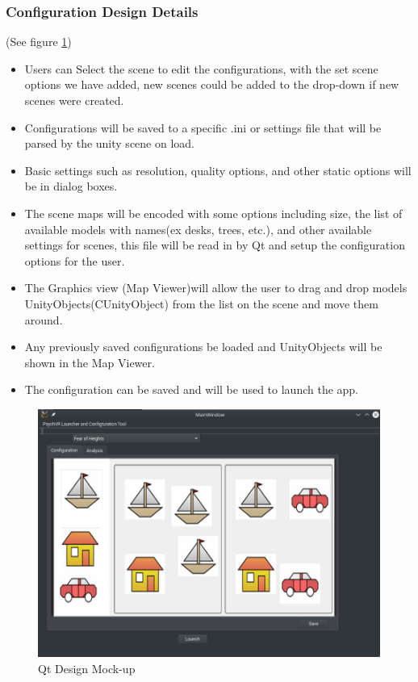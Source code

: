 \documentclass[a4paper,10pt]{article}
\begin{document}
\subsubsection {Configuration Design Details}
(See figure \ref{fig:qtMockupMap})
\begin{itemize}
\item Users can Select the scene to edit the configurations, with the set scene options we have added, new scenes could be added to the drop-down if new scenes were created.
\item Configurations will be saved to a specific .ini or settings file that will be parsed by the unity scene on load.
\item Basic settings such as resolution, quality options, and other static options will be in dialog boxes.
\item The scene maps will be encoded with some options including size, the list of available models with names(ex desks, trees, etc.), and other available settings for scenes, this file will be read in by Qt and setup the configuration options for the user.
\item The Graphics view (Map Viewer)will allow the user to drag and drop models UnityObjects(CUnityObject) from the list on the scene and move them around. %
\item Any previously saved configurations be loaded and UnityObjects will be shown in the Map Viewer.
\item The configuration can be saved and will be used to launch the app.

\end{itemize}
\begin{figure}[H]
				      \centerline{\includegraphics[scale = 0.35]{qtConfigMap.png}}
					\caption{Qt Design Mock-up}
					\label{fig:qtMockupMap}
				\end{figure}
\pagebreak
\end{document}
